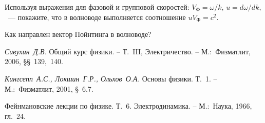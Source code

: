 \begin{lab:questions} 
    \item Используя выражения для фазовой и групповой
    скоростей: $V_{\text{Ф}}=\omega/k$, $u=d\omega/dk,$~--- покажите, что в
    волноводе выполняется соотношение $uV_{\text{Ф}}=c^2.$
    
    \item Как направлен вектор Пойнтинга в волноводе? 
\end{lab:questions}


\begin{lab:literature} 
    \item \emph{Сивухин~Д.В.} Общий курс физики. – Т.~III,
    Электричество. – М.:~Физматлит, 2006, §§~139,~140.
    
    \item \emph{Кингсепп~А.С., Локшин~Г.Р., Ольхов~О.А.} Основы физики. Т.~1. –
    М.:~Физматлит, 2001, §~6.7.
    
    \item Фейнмановские лекции по физике. Т.~6. Электродинамика. – М.:~Наука, 1966,
    гл.~24. 
\end{lab:literature}